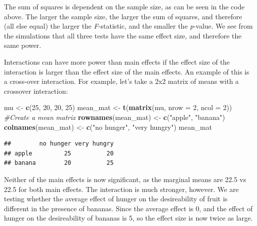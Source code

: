 \documentclass[]{book}
\newenvironment{Shaded}{\begin{snugshade}}{\end{snugshade}}
\newcommand{\CommentTok}[1]{\textcolor[rgb]{0.56,0.35,0.01}{\textit{#1}}}
\newcommand{\DataTypeTok}[1]{\textcolor[rgb]{0.13,0.29,0.53}{#1}}
\newcommand{\DecValTok}[1]{\textcolor[rgb]{0.00,0.00,0.81}{#1}}
\newcommand{\KeywordTok}[1]{\textcolor[rgb]{0.13,0.29,0.53}{\textbf{#1}}}
\newcommand{\NormalTok}[1]{#1}
\newcommand{\StringTok}[1]{\textcolor[rgb]{0.31,0.60,0.02}{#1}}
\begin{document}
The sum of squares is dependent on the sample size, as can be seen in the code above. The larger the sample size, the larger the sum of squares, and therefore (all else equal) the larger the \emph{F}-statistic, and the smaller the \emph{p}-value. We see from the simulations that all three tests have the same effect size, and therefore the same power.

Interactions can have more power than main effects if the effect size of the interaction is larger than the effect size of the main effects. An example of this is a cross-over interaction. For example, let's take a 2x2 matrix of means with a crossover interaction:

\begin{Shaded}
\begin{Highlighting}[]
\NormalTok{mu <-}\StringTok{ }\KeywordTok{c}\NormalTok{(}\DecValTok{25}\NormalTok{, }\DecValTok{20}\NormalTok{, }\DecValTok{20}\NormalTok{, }\DecValTok{25}\NormalTok{)}
\NormalTok{mean_mat <-}\StringTok{ }\KeywordTok{t}\NormalTok{(}\KeywordTok{matrix}\NormalTok{(mu, }
                     \DataTypeTok{nrow =} \DecValTok{2}\NormalTok{,}
                     \DataTypeTok{ncol =} \DecValTok{2}\NormalTok{)) }\CommentTok{#Create a mean matrix}
\KeywordTok{rownames}\NormalTok{(mean_mat) <-}\StringTok{ }\KeywordTok{c}\NormalTok{(}\StringTok{"apple"}\NormalTok{, }\StringTok{"banana"}\NormalTok{)}
\KeywordTok{colnames}\NormalTok{(mean_mat) <-}\StringTok{ }\KeywordTok{c}\NormalTok{(}\StringTok{"no hunger"}\NormalTok{, }\StringTok{"very hungry"}\NormalTok{)}
\NormalTok{mean_mat}
\end{Highlighting}
\end{Shaded}

\begin{verbatim}
##        no hunger very hungry
## apple         25          20
## banana        20          25
\end{verbatim}

Neither of the main effects is now significant, as the marginal means are 22.5 vs 22.5 for both main effects. The interaction is much stronger, however. We are testing whether the average effect of hunger on the desireability of fruit is different in the presence of bananas. Since the average effect is 0, and the effect of hunger on the desireability of bananas is 5, so the effect size is now twice as large.
\end{document}
